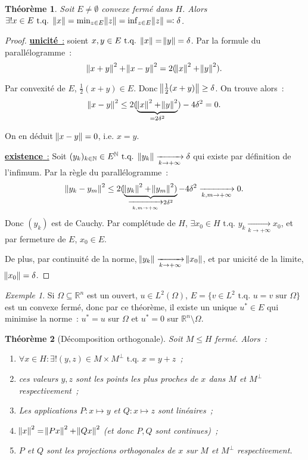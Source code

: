 \documentclass{report}
\newcommand{\R}{{\mathbb R}}
\newcommand{\N}{{\mathbb N}}
\newcommand{\tq}{\text{ t.q. }}
\newcommand{\pinfty}{{+\infty}}
\newcommand{\unic}{{\underline {\textbf{unicité}~:}} }
\newcommand{\exis}{{\underline {\textbf{existence}~:}} }
\newtheorem{thm}{Théorème}[chapter]
\theoremstyle{definition}
\theoremstyle{remark}
\newtheorem{ex}{Exemple}[chapter]
\begin{document}
\begin{thm} Soit $E \neq \emptyset$ convexe fermé dans $H$. Alors $\exists! x \in E \tq \norm x = \min_{z \in E}\norm z = \inf_{z \in E}\norm z \eqqcolon \delta$.
\end{thm}

\begin{proof} \unic soient $x, y \in E \tq \norm x = \norm y = \delta$. Par la formule du parallélogramme~:
\[\norm {x+y}^2 + \norm {x-y}^2 = 2(\norm x^2+\norm y^2).\]

Par convexité de $E$, $\frac 12(x+y) \in E$. Donc $\norm {\frac 12(x+y)} \geq \delta$. On trouve alors~:
\[\norm {x-y}^2 \leq 2(\underbrace {\norm x^2 + \norm y^2}_{=2\delta^2}) - 4\delta^2 = 0.\]

On en déduit $\norm {x-y} = 0$, i.e. $x=y$.

\exis Soit $(y_k)_{k \in \N} \in E^\N \tq \norm {y_k} \xrightarrow[k \to \pinfty]{} \delta$ qui existe par définition de l'infimum. Par la règle du parallélogramme~:
\[\norm {y_k - y_m}^2 \leq 2(\underbrace {\norm {y_k}^2+\norm {y_m}^2)}_{\xrightarrow[k, m \to \pinfty]{} 2\delta^2} - 4\delta^2 \xrightarrow[k, m \to \pinfty]{} 0.\]
Donc $(y_k)$ est de Cauchy. Par complétude de $H$, $\exists x_0 \in H \tq y_k \xrightarrow[k \to \pinfty]{} x_0$, et par fermeture de $E$, $x_0 \in E$.

De plus, par continuité de la norme, $\norm {y_k} \xrightarrow[k \to \pinfty]{} \norm {x_0}$, et par unicité de la limite, $\norm {x_0} = \delta$.
\end{proof}

\begin{ex} Si $\Omega \subseteq \R^n$ est un ouvert, $u \in L^2(\Omega)$, $E = \{v \in L^2 \tq u=v \text{ sur } \Omega\}$ est un convexe fermé, donc par ce théorème,
il existe un unique $u^* \in E$ qui minimise la norme~: $u^* = u$ sur $\Omega$ et $u^*=0$ sur $\R^n \setminus \Omega$.
\end{ex}

\begin{thm}[Décomposition orthogonale] Soit $M \leq H$ fermé. Alors~:
\begin{enumerate}
	\item $\forall x \in H : \exists! (y, z) \in M \times M^\perp \tq x=y+z$~;
	\item ces valeurs $y, z$ sont les points les plus proches de $x$ dans $M$ et $M^\perp$ respectivement~;
	\item Les applications $P : x \mapsto y$ et $Q : x \mapsto z$ sont linéaires~;
	\item $\norm x^2 = \norm {Px}^2 + \norm {Qx}^2$ (et donc $P,Q$ sont continues)~;
	\item $P$ et $Q$ sont les projections orthogonales de $x$ sur $M$ et $M^\perp$ respectivement.
\end{enumerate}
\end{thm}
\end{document}
